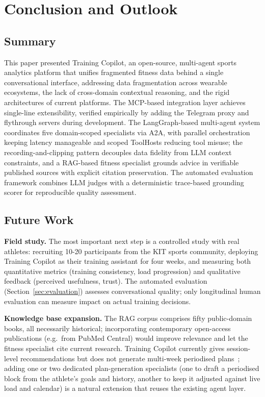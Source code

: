 \section{Conclusion and Outlook}\label{sec:conclusion}

\subsection{Summary}\label{sec:conclusion:summary}

This paper presented Training Copilot, an open-source, multi-agent sports analytics platform that unifies fragmented fitness data behind a single conversational interface, addressing data fragmentation across wearable ecosystems, the lack of cross-domain contextual reasoning, and the rigid architectures of current platforms. The MCP-based integration layer achieves single-line extensibility, verified empirically by adding the Telegram proxy and flythrough servers during development. The LangGraph-based multi-agent system coordinates five domain-scoped specialists via A2A, with parallel orchestration keeping latency manageable and scoped ToolHosts reducing tool misuse; the recording-and-clipping pattern decouples data fidelity from LLM context constraints, and a RAG-based fitness specialist grounds advice in verifiable published sources with explicit citation preservation. The automated evaluation framework combines LLM judges with a deterministic trace-based grounding scorer for reproducible quality assessment.

\subsection{Future Work}\label{sec:conclusion:next}

\textbf{Field study.} The most important next step is a controlled study with real athletes: recruiting 10-20 participants from the KIT sports community, deploying Training Copilot as their training assistant for four weeks, and measuring both quantitative metrics (training consistency, load progression) and qualitative feedback (perceived usefulness, trust). The automated evaluation (Section~\ref{sec:evaluation}) assesses conversational quality; only longitudinal human evaluation can measure impact on actual training decisions.

\textbf{Knowledge base expansion.} The RAG corpus comprises fifty public-domain books, all necessarily historical; incorporating contemporary open-access publications (e.g.\ from PubMed Central) would improve relevance and let the fitness specialist cite current research. Training Copilot currently gives session-level recommendations but does not generate multi-week periodised plans~\citep{grgic_periodization_2017}; adding one or two dedicated plan-generation specialists (one to draft a periodised block from the athlete's goals and history, another to keep it adjusted against live load and calendar) is a natural extension that reuses the existing agent layer.

